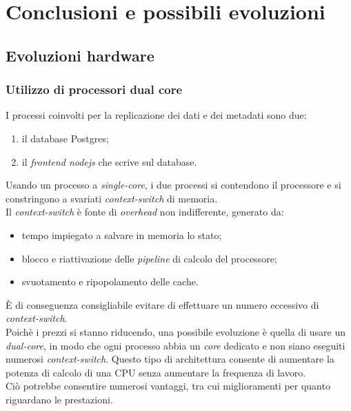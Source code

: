 \chapter{Conclusioni e possibili evoluzioni}

\item
\section{Evoluzioni hardware}

\item 
\subsection{Utilizzo di processori dual core}
I processi coinvolti per la replicazione dei dati e dei metadati sono due: 
\begin{enumerate}
\item 
il database Postgres;
\item
il \textit{frontend nodejs} che scrive sul database.
\end{enumerate}

Usando un processo a \textit{single-core}, i due processi si contendono il processore e si constringono a svariati \textit{context-switch} di memoria.\\
Il \textit{context-switch} \`{e} fonte di \textit{overhead} non indifferente, generato da:

\begin{itemize}
\item 
tempo impiegato a salvare in memoria lo stato;
\item
blocco e riattivazione delle \textit{pipeline} di calcolo del processore;
\item 
svuotamento e ripopolamento delle cache.
\end{itemize}

\`{E} di conseguenza consigliabile evitare di effettuare un numero eccessivo di \textit{context-switch}.\\

Poich\`{e} i prezzi si stanno riducendo, una possibile evoluzione \`{e} quella di usare un \textit{dual-core}, in modo che ogni processo abbia un \textit{core} dedicato e non siano eseguiti numerosi \textit{context-switch}. Questo tipo di architettura consente di aumentare la potenza di calcolo di una CPU senza aumentare la frequenza di lavoro. \\
Ci\`{o} potrebbe consentire numerosi vantaggi, tra cui miglioramenti per quanto riguardano le prestazioni.

